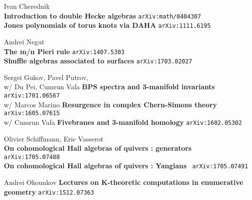 \documentclass[12pt]{article}
\begin{document}
\vfill

\begin{thebibliography}{}
\item Ivan Cherednik \\
\textbf{Introduction to double Hecke algebras} \texttt{arXiv:math/0404307} \\
\textbf{Jones polynomials of torus knots via DAHA} \texttt{arXiv:1111.6195}

\item Andrei Negut \\
\textbf{The m/n Pieri rule} \texttt{arXiv:1407.5303} \\
\textbf{Shuffle algebras associated to surfaces} \texttt{arXiv:1703.02027}

\item Sergei Gukov, Pavel Putrov, \\
w/ Du Pei, Cumrun Vafa \hspace{1em} \textbf{BPS spectra and 3-manifold invariants} \hspace{3.5em} \texttt{arXiv:1701.06567} \\
w/ Marcos Marino \hspace{3.5em} \textbf{Resurgence in complex Chern-Simons theory} \texttt{arXiv:1605.07615} \\
w/ Cumrun Vafa \hspace{4em} \textbf{Fivebranes and 3-manifold homology} \hspace{3.5em}\texttt{arXiv:1602.05302} 

\item Olivier Schiffmann, Eric Vasserot \\
\textbf{On cohomological Hall algebras of quivers : generators} \texttt{arXiv:1705.07488} \\
\textbf{On cohomological Hall algebras of quivers : Yangians} \;\texttt{ arXiv:1705.07491}

\item Andrei Okounkov \textbf{Lectures on K-theoretic computations in enumerative geometry} \texttt{arXiv:1512.07363}

\end{thebibliography}
\end{document}
